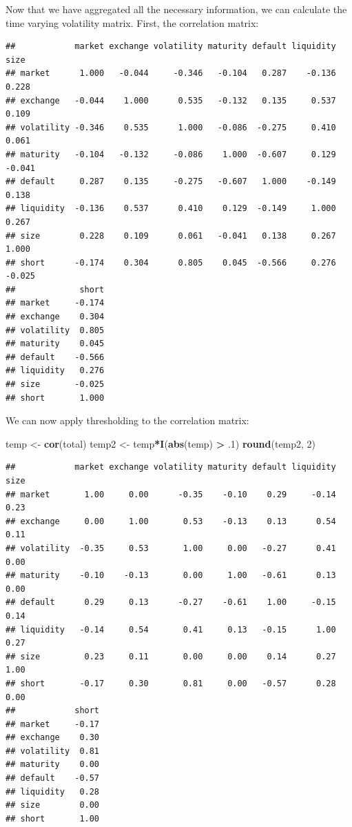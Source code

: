 \documentclass[11pt,]{article}
\newenvironment{Shaded}{\begin{snugshade}}{\end{snugshade}}
\newcommand{\KeywordTok}[1]{\textcolor[rgb]{0.13,0.29,0.53}{\textbf{#1}}}
\newcommand{\DecValTok}[1]{\textcolor[rgb]{0.00,0.00,0.81}{#1}}
\newcommand{\StringTok}[1]{\textcolor[rgb]{0.31,0.60,0.02}{#1}}
\newcommand{\OperatorTok}[1]{\textcolor[rgb]{0.81,0.36,0.00}{\textbf{#1}}}
\newcommand{\NormalTok}[1]{#1}
\renewenvironment{quote}{\begin{shaded*}}{\end{shaded*}}
\begin{document}
\begin{quote}
Now that we have aggregated all the necessary information, we can
calculate the time varying volatility matrix. First, the correlation
matrix:
\end{quote}

\begin{verbatim}
##            market exchange volatility maturity default liquidity   size
## market      1.000   -0.044     -0.346   -0.104   0.287    -0.136  0.228
## exchange   -0.044    1.000      0.535   -0.132   0.135     0.537  0.109
## volatility -0.346    0.535      1.000   -0.086  -0.275     0.410  0.061
## maturity   -0.104   -0.132     -0.086    1.000  -0.607     0.129 -0.041
## default     0.287    0.135     -0.275   -0.607   1.000    -0.149  0.138
## liquidity  -0.136    0.537      0.410    0.129  -0.149     1.000  0.267
## size        0.228    0.109      0.061   -0.041   0.138     0.267  1.000
## short      -0.174    0.304      0.805    0.045  -0.566     0.276 -0.025
##             short
## market     -0.174
## exchange    0.304
## volatility  0.805
## maturity    0.045
## default    -0.566
## liquidity   0.276
## size       -0.025
## short       1.000
\end{verbatim}

\begin{quote}
We can now apply thresholding to the correlation matrix:
\end{quote}

\begin{Shaded}
\begin{Highlighting}[]
\NormalTok{temp <-}\StringTok{ }\KeywordTok{cor}\NormalTok{(total)}
\NormalTok{temp2 <-}\StringTok{ }\NormalTok{temp}\OperatorTok{*}\KeywordTok{I}\NormalTok{(}\KeywordTok{abs}\NormalTok{(temp) }\OperatorTok{>}\StringTok{ }\NormalTok{.}\DecValTok{1}\NormalTok{)}
\KeywordTok{round}\NormalTok{(temp2, }\DecValTok{2}\NormalTok{)}
\end{Highlighting}
\end{Shaded}

\begin{verbatim}
##            market exchange volatility maturity default liquidity size
## market       1.00     0.00      -0.35    -0.10    0.29     -0.14 0.23
## exchange     0.00     1.00       0.53    -0.13    0.13      0.54 0.11
## volatility  -0.35     0.53       1.00     0.00   -0.27      0.41 0.00
## maturity    -0.10    -0.13       0.00     1.00   -0.61      0.13 0.00
## default      0.29     0.13      -0.27    -0.61    1.00     -0.15 0.14
## liquidity   -0.14     0.54       0.41     0.13   -0.15      1.00 0.27
## size         0.23     0.11       0.00     0.00    0.14      0.27 1.00
## short       -0.17     0.30       0.81     0.00   -0.57      0.28 0.00
##            short
## market     -0.17
## exchange    0.30
## volatility  0.81
## maturity    0.00
## default    -0.57
## liquidity   0.28
## size        0.00
## short       1.00
\end{verbatim}
\end{document}
